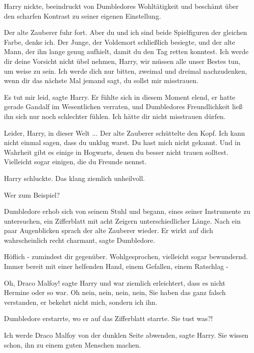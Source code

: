 Harry nickte, beeindruckt von Dumbledores Wohltätigkeit und beschämt über den
scharfen Kontrast zu seiner eigenen Einstellung.

Der alte Zauberer fuhr fort. \glqq{}Aber du und ich sind beide Spielfiguren der
gleichen Farbe, denke ich. Der Junge, der Voldemort schließlich besiegte, und
der alte Mann, der ihn lange genug aufhielt, damit du den Tag retten konntest.
Ich werde dir deine Vorsicht nicht übel nehmen, Harry, wir müssen alle unser
Bestes tun, um weise zu sein. Ich werde dich nur bitten, zweimal und dreimal
nachzudenken, wenn dir das nächste Mal jemand sagt, du sollst mir
misstrauen.\grqq{}

\glqq{}Es tut mir leid\grqq{}, sagte Harry. Er fühlte sich in diesem Moment
elend, er hatte gerade Gandalf im Wesentlichen verraten, und Dumbledores
Freundlichkeit ließ ihn sich nur noch schlechter fühlen. \glqq{}Ich hätte dir
nicht misstrauen dürfen.\grqq{}

\glqq{}Leider, Harry, in dieser Welt ...\grqq{} Der alte Zauberer schüttelte den
Kopf. \glqq{}Ich kann nicht einmal sagen, dass du unklug warst. Du hast mich
nicht gekannt. Und in Wahrheit gibt es einige in Hogwarts, denen du besser nicht
trauen solltest. Vielleicht sogar einigen, die du Freunde nennst.\grqq{}

Harry schluckte. Das klang ziemlich unheilvoll.

\glqq{}Wer zum Beispiel?\grqq{}

Dumbledore erhob sich von seinem Stuhl und begann, eines seiner Instrumente zu
untersuchen, ein Zifferblatt mit acht Zeigern unterschiedlicher Länge. Nach ein
paar Augenblicken sprach der alte Zauberer wieder. \glqq{}Er wirkt auf dich
wahrscheinlich recht charmant\grqq{}, sagte Dumbledore.

\glqq{}Höflich - zumindest dir gegenüber. Wohlgesprochen, vielleicht sogar
bewundernd. Immer bereit mit einer helfenden Hand, einem Gefallen, einem
Ratschlag -\grqq{}

\glqq{}Oh, Draco Malfoy!\grqq{} sagte Harry und war ziemlich erleichtert, dass es
nicht Hermine oder so war. \glqq{}Oh nein, nein, nein, nein, Sie haben das ganz
falsch verstanden, er bekehrt nicht mich, sondern ich ihn.\grqq{}

Dumbledore erstarrte, wo er auf das Zifferblatt starrte. \glqq{}Sie tust
was?!\grqq{}

\glqq{}Ich werde Draco Malfoy von der dunklen Seite abwenden\grqq{}, sagte Harry.
\glqq{}Sie wissen schon, ihn zu einem guten Menschen machen.\grqq{}

